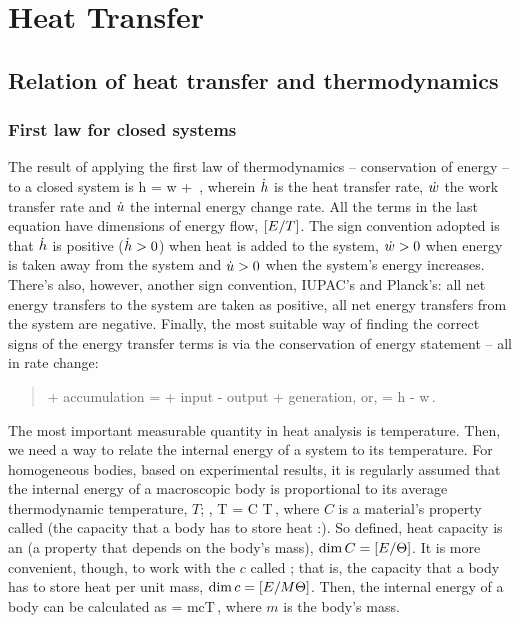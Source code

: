 \section{Heat Transfer}

\subsection{Relation of heat transfer and thermodynamics}

\subsubsection{First law for closed systems}
The result of applying the first law of thermodynamics -- conservation of energy -- to a closed system is
\beq
\dt h = \dt w + \dt\ien\,,
\eeq
wherein $\dot{h}$ is the heat transfer rate, $\dot{w}$ the work transfer rate and $\dot{u}$ the internal energy change rate. All the terms in the last equation have dimensions of energy flow, $\left[{E/T}\right]$. The sign convention adopted is that $\dot{h}$ is positive ($\dot{h} > 0$) when heat is added to the system, $\dot{w} > 0$ when energy is taken away from the system and $\dot{u} > 0$ when the system's energy increases. There's also, however, another sign convention, IUPAC's and Planck's: all net energy transfers to the system are taken as positive, all net energy transfers from the system are negative. Finally, the most suitable way of finding the correct signs of the energy transfer terms is via the conservation of energy statement -- all in rate change:
\begin{quote}
+ accumulation = + input - output + generation, or,
\beq
\dt\ien = \dt h - \dt w\,.
\eeq
\end{quote}

The most important measurable quantity in heat analysis is temperature. Then, we need a way to relate the internal energy of a system to its temperature. For homogeneous bodies, based on experimental results, it is regularly assumed that the internal energy of a macroscopic body is proportional to its average thermodynamic temperature, $T$; \ie,
\beq
\ien \propto T\implies 
\ien = C T\,,
\eeq
where $C$ is a material's property called  (the capacity that a body has to store heat :). So defined, heat capacity is an  (a property that depends on the body's mass), $\dim C = \left[{E/\Theta}\right]$. It is more convenient, though, to work with the  $c$ called ; that is, the capacity that a body has to store heat per unit mass, $\dim c = \left[{E/M\Theta}\right]$. Then, the internal energy of a body can be calculated as
\beq
\ien = mcT\,,
\eeq
where $m$ is the body's mass.

